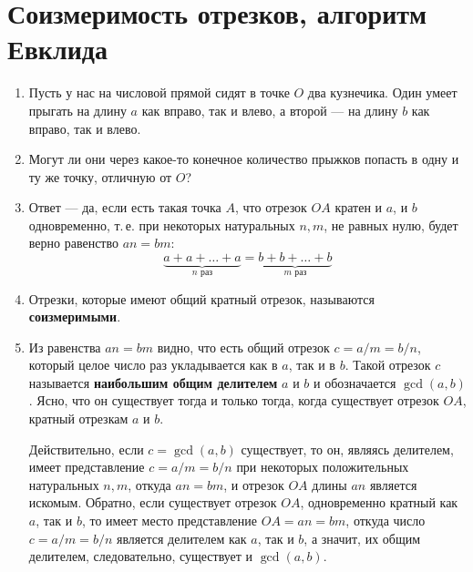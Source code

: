 \section{Соизмеримость отрезков, алгоритм Евклида}



\begin{enumerate}
\item Пусть у нас на числовой прямой сидят в точке $O$ два кузнечика. Один умеет прыгать на длину $a$ как вправо, так и влево, а второй --- на длину $b$ как вправо, так и влево.

\item Могут ли они через какое-то конечное количество прыжков попасть в одну и ту же точку, отличную от $O$?
\item Ответ --- да, если есть такая точка $A$, что отрезок $OA$ кратен и $a$, и $b$ одновременно, т.\,е. при некоторых натуральных $n,m$, не равных нулю, будет верно равенство $an=bm$:
$$
\underbrace{a+a+\dots+a}_{n\mbox{ раз}}=\underbrace{b+b+\dots+b}_{m\mbox{ раз}}
$$
\item Отрезки, которые имеют общий кратный отрезок, называются \textbf{соизмеримыми}.
\item Из равенства $an=bm$ видно, что есть общий отрезок $c=a/m=b/n$, который целое число раз укладывается как в $a$, так и в $b$. Такой отрезок $c$ называется \textbf{наибольшим общим делителем} $a$ и $b$ и обозначается $\gcd(a,b)$. Ясно, что он существует тогда и только тогда, когда существует отрезок $OA$, кратный отрезкам $a$ и $b$.

Действительно, если $c=\gcd(a,b)$ существует, то он, являясь делителем, имеет представление $c=a/m=b/n$ при некоторых положительных натуральных $n,m$, откуда $an=bm$, и отрезок $OA$ длины $an$ является искомым. Обратно, если существует отрезок $OA$, одновременно кратный как $a$, так и $b$, то имеет место представление $OA=an=bm$, откуда число $c=a/m=b/n$ является делителем как $a$, так и $b$, а значит, их общим делителем, следовательно, существует и $\gcd(a,b)$.


\end{enumerate}
